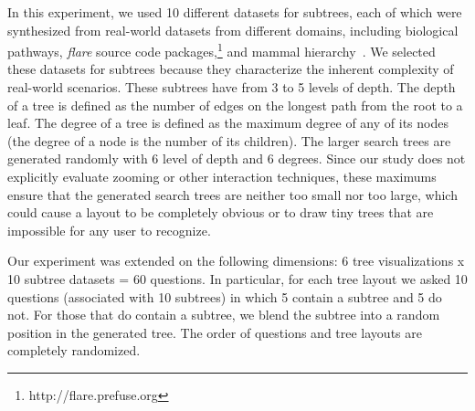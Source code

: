 \documentclass[a4paper]{llncs}
\begin{document}


 
In this experiment, we used 10 different datasets for subtrees, each of which were synthesized from real-world datasets from different domains, including biological pathways, \textit{flare} source code packages,\footnote{http://flare.prefuse.org} and mammal hierarchy~\cite{OneZoom2012}. We selected these datasets for subtrees because they characterize the inherent complexity of real-world scenarios. These subtrees have from 3 to 5 levels of depth. The depth of a tree is defined as the number of edges on the longest path from the root to a leaf. The degree of a tree is defined as the maximum degree of any of its nodes (the degree of a node is the number of its children).
The larger search trees are generated randomly with 6 level of depth and 6 degrees. Since our study does not explicitly evaluate zooming or other interaction techniques, these maximums ensure that the generated search trees are neither too small nor too large, which could cause a layout to be completely obvious or to draw tiny trees that are impossible for any user to recognize. %

Our experiment was extended on the following dimensions: 6 tree visualizations x 10 subtree datasets = 60 questions. In particular, for each tree layout we asked 10 questions (associated with 10 subtrees) in which 5 contain a subtree and 5 do not. For those that do contain a subtree, we blend the subtree into a random position in the generated tree. The order of questions and tree layouts are completely randomized.
\end{document}
